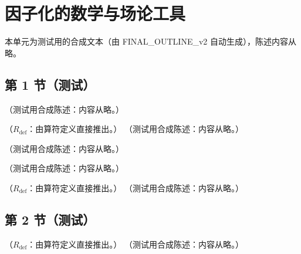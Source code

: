 \chapter{因子化的数学与场论工具}\label{ch:prelim}
本单元为测试用的合成文本（由 FINAL\_OUTLINE\_v2 自动生成），陈述内容从略。

\section{第 1 节（测试）}\label{sec:prelim-lightfront}

\begin{definition}\label{def:prelim-lightfront}
（测试用合成陈述：内容从略。）
\end{definition}

\begin{lemma}\label{lem:prelim-boost}
（$R_{\mathrm{def}}$：由算符定义直接推出。）
（测试用合成陈述：内容从略。）
\end{lemma}

\begin{example}\label{ex:prelim-boost-scaling}
（测试用合成陈述：内容从略。）
\end{example}

\begin{definition}[Wilson 线]\label{def:prelim-wilson}
（测试用合成陈述：内容从略。）
\end{definition}

\begin{proposition}\label{prop:prelim-wilson-covariance}
（$R_{\mathrm{def}}$：由算符定义直接推出。）
（测试用合成陈述：内容从略。）
\end{proposition}

\section{第 2 节（测试）}\label{sec:prelim-wilson}

\begin{proposition}\label{prop:prelim-wilson-rules}
（$R_{\mathrm{def}}$：由算符定义直接推出。）
（测试用合成陈述：内容从略。）
\end{proposition}


